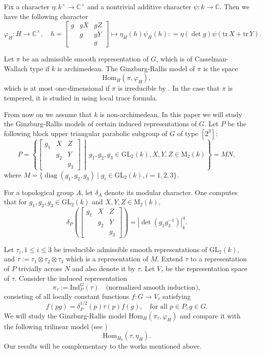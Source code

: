 \documentclass[12pt]{amsart}
\newcommand{\BC}{{\mathbb {C}}}
\newcommand{\RM}{{\mathrm {M}}}
\newcommand{\GL}{{\mathrm{GL}}}
\newcommand{\Hom}{{\mathrm{Hom}}}
\newcommand{\Ind}{{\mathrm{Ind}}}
\newcommand{\tr}{{\mathrm{tr}}}
\newcommand{\diag}{\operatorname{diag}}
\newcommand{\absk}[1]{\left\lvert#1\right\rvert_k}
\theoremstyle{Theorem}
\theoremstyle{Theorem}
\theoremstyle{Theorem}
\theoremstyle{Theorem}
\theoremstyle{Plain}
\theoremstyle{remark}
\theoremstyle{remark}
\theoremstyle{Definition}
\begin{document}
Fix a character $ \eta: k^\times \to \mathbb{C}^\times $ and a nontrivial additive character $ \psi: k \to \mathbb{C} $. Then we have the following character 
\[
    \varphi_H: H\to\BC^\times,\quad h =
        \begin{bmatrix}
            g & gX & gZ\\
              & g  & gY\\
              &    & g
        \end{bmatrix}
        \mapsto \eta_H(h) \psi_H(h): = \eta(\det g) \psi(\tr\,X + \tr\,Y).
\]

Let $\pi$ be an admissible smooth representation of $G$, which is of Casselman-Wallach type if $k$ is archimedean.  The Ginzburg-Rallis model of $\pi$ is the space
\[
    \Hom_H \left( \pi, \varphi_H \right),
\]
which is at most one-dimensional if $\pi$ is irreducible by \cite{JSZ, JLX}. In the case that $\pi$ is tempered, it is studied in \cite{W} using local trace formula.

From now on we assume that $k$ is non-archimedean. In this paper we will study the  Ginzburg-Rallis models of certain induced representations of $G$. Let $P$ be the following block upper triangular 
parabolic subgroup of $G$ of type $[2^3]$:
\[
    P = \left\{
    \begin{bmatrix}
        g_1 & X   & Z  \\
            & g_2 & Y  \\
            &     & g_3
    \end{bmatrix}
    \, \middle| \, g_1, g_2, g_3 \in \GL_2(k), X, Y, Z \in \RM_2(k) \right\} = MN,
\]
where $ M = \{ \diag(g_1, g_2, g_3) \mid g_i \in \GL_2(k), i = 1, 2, 3 \} $.

For a topological group $A$, let $\delta_A$ denote its modular character. One computes that for $ g_1, g_2, g_3 \in \GL_2(k) $ and $ X, Y, Z \in \mathrm{M}_2(k) $,
\[
    \delta_P \left(
    \begin{bmatrix}
        g_1 & X   & Z  \\
            & g_2 & Y  \\
            &     & g_3
    \end{bmatrix}
    \right) = \absk{ \det \left( g_1 g_3^{-1} \right) }^4.
\]

Let $ \tau_i, 1 \le i \le 3 $ be irreducible admissible smooth representations of $\GL_2(k)$, and $ \tau := \tau_1 \otimes \tau_2 \otimes \tau_3 $ 
which is a representation of $M$. Extend $\tau$ to a representation of $P$ trivially across $N$ and also denote it by $\tau$. Let $V_\tau$ be the representation space of $\tau$. Consider the induced representation
\[
    \pi_\tau := \Ind^G_P( \tau ) \quad \text{(normalized smooth induction)},
\]
consisting of all locally constant functions $ f: G \rightarrow V_\tau $ satisfying
\[
    f(pg) = \delta_P^{1/2}(p) \tau(p) f(g),\quad \text{for all } p \in P, g \in G.
\]
We will study the Ginzburg-Rallis model $\Hom_H\left(\pi_\tau,\varphi_H\right)$ and compare it with the following trilinear model (see \cite{Prasad})
\[
    \Hom_{H_0} ( \tau, \eta_H ).
\]
Our results will be complementary to the works mentioned above.
\end{document}
